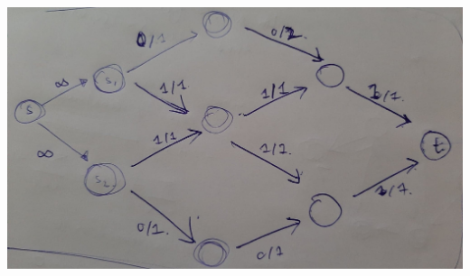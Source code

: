 \documentclass[12pt]{article}
\begin{document}
\begin{enumerate}[1.]
    \bigskip

    \begin{center}
    \includegraphics[width=0.7\linewidth]{images/worksheet_5_solution_7.jpg}
    \end{center}

    \bigskip









\end{enumerate}
\end{document}
